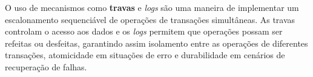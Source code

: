 \documentclass[11pt,twoside,a4paper]{book}
\begin{document}
O uso de mecanismos como \textbf{travas} e \emph{logs} são uma maneira de implementar um escalonamento sequenciável de operações de transações simultâneas. As travas controlam o acesso aos dados e os \emph{logs} permitem que operações possam ser refeitas ou desfeitas, garantindo assim isolamento entre as operações de diferentes transações, atomicidade em situações de erro e durabilidade em cenários de recuperação de falhas.




\end{document}
